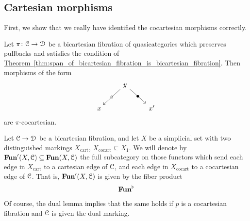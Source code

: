 \documentclass[main.tex]{subfiles}
\begin{document}
\subsection{Cartesian morphisms}
\label{ssc:cartesian_morphisms}

First, we show that we really have identified the cocartesian morphisms correctly.

\begin{proposition}
  \label{prop:form_of_cocartesian_morphisms_in_spans}
  Let $\pi\colon \mathcal{C} \to \mathcal{D}$ be a bicartesian fibration of quasicategories which preserves pullbacks and satisfies the condition of \hyperref[thm:span_of_bicartesian_fibration_is_bicartesian_fibration]{Theorem~\ref*{thm:span_of_bicartesian_fibration_is_bicartesian_fibration}}. Then morphisms of the form
  \begin{equation*}
    \begin{tikzcd}
      & y
      \arrow[dl, "\circ" marking]
      \arrow[dr, "\bullet" marking]
      \\
      x
      && x'
    \end{tikzcd}
  \end{equation*}
  are $\pi$-cocartesian.
\end{proposition}

Let $\mathcal{C} \to \mathcal{D}$ be a bicartesian fibration, and let $X$ be a simplicial set with two distinguished markings $X_{\mathrm{cart}}$, $X_{\mathrm{cocart}} \subseteq X_{1}$. We will denote by $\mathbf{Fun}'(X, \mathcal{C}) \subseteq \mathbf{Fun}(X, \mathcal{C})$ the full subcategory on those functors which send each edge in $X_{\mathrm{cart}}$ to a cartesian edge of $\mathcal{C}$, and each edge in $X_{\mathrm{cocart}}$ to a cocartesian edge of $\mathcal{C}$. That is, $\mathbf{Fun}'(X, \mathcal{C})$ is given by the fiber product
\begin{equation*}
  \mathbf{Fun}^{\flat}
\end{equation*}

Of course, the dual lemma implies that the same holds if $p$ is a cocartesian fibration and $\mathcal{C}$ is given the dual marking.
\end{document}
